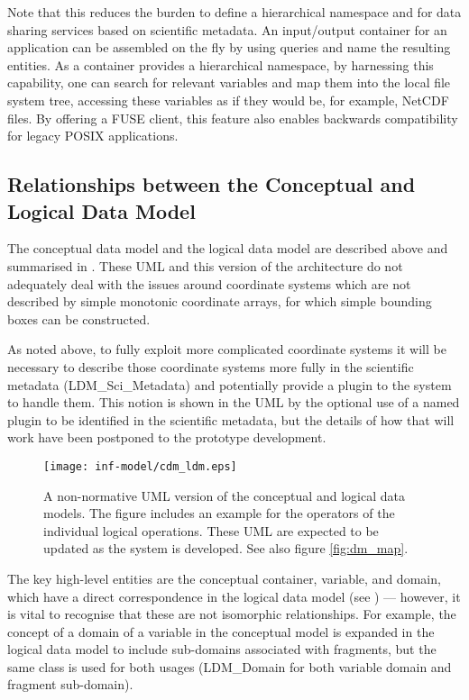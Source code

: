 Note that this reduces the burden to define a hierarchical namespace and for data sharing services based on scientific metadata.
An input/output container for an application can be assembled on the fly by using queries and name the resulting entities.
As a container provides a hierarchical namespace,
by harnessing this capability, one can search for relevant variables and map them into the local file system tree, accessing these variables as if they would be, for example, NetCDF files.
By offering a FUSE client, this feature also enables backwards compatibility for legacy POSIX applications.



\subsection{Relationships between the Conceptual and Logical Data Model}
\label{subsec-mapping}

The conceptual data model and the logical data model are described above and summarised in .
These UML and this version of the architecture do not adequately deal with the issues around coordinate systems which are not described by simple monotonic coordinate arrays, for which simple bounding boxes can be constructed.

As noted above, to fully exploit more complicated coordinate systems it will be necessary to describe those coordinate systems more fully in the scientific metadata (LDM\_Sci\_Metadata) and potentially provide a plugin to the system to handle them.
This notion is shown in the UML by the optional use of a named plugin to be identified in the scientific metadata, but the details of how that will work have been postponed to the prototype development.

\begin{figure}
	\centering
	\texttt{[image: inf-model/cdm\_ldm.eps]}
	\caption{A non-normative UML version of the conceptual and logical data models.
	The figure includes an example for the operators of the individual logical operations.
	These UML are expected to be updated as the system is developed.  See also figure \ref{fig:dm_map}.}
	\label{fig:cdm_ldm}
\end{figure}

The key high-level entities are the conceptual container, variable, and domain, which have a direct correspondence in the logical
data model (see ) --- however, it is vital to recognise that these are not isomorphic relationships. For example,
the concept of a domain of a variable in the conceptual model is expanded in the logical data model to include sub-domains associated
with fragments, but the same class is used for both usages (LDM\_Domain for both variable domain and fragment sub-domain).

